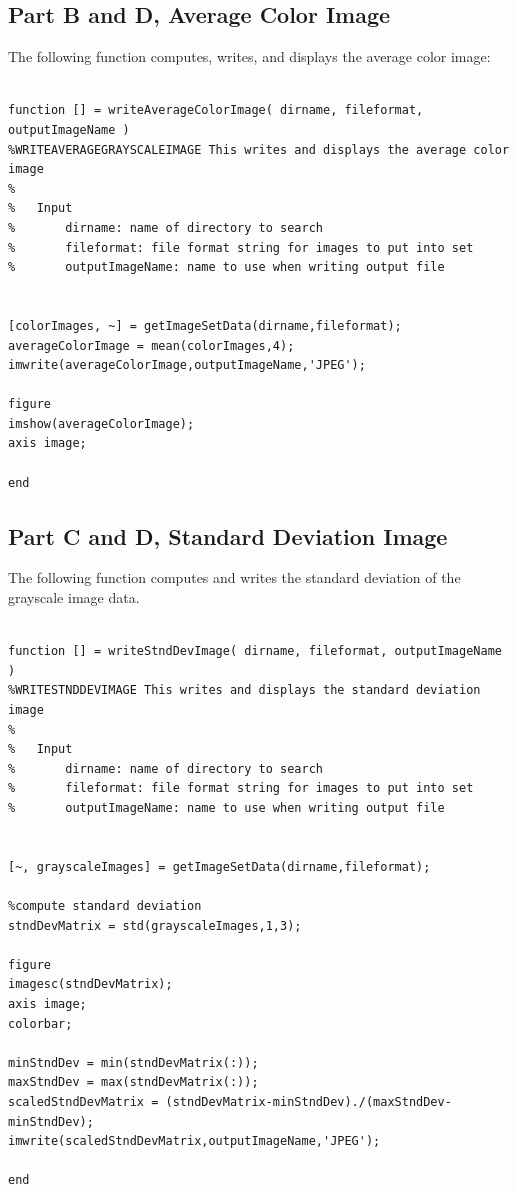 \documentclass[11pt,psfig]{article}
\begin{document}
\subsection*{Part B and D, Average Color Image}

The following function computes, writes, and displays the average color image:

\begin{verbatim}

function [] = writeAverageColorImage( dirname, fileformat, outputImageName )
%WRITEAVERAGEGRAYSCALEIMAGE This writes and displays the average color image
%
%   Input
%       dirname: name of directory to search
%       fileformat: file format string for images to put into set
%       outputImageName: name to use when writing output file


[colorImages, ~] = getImageSetData(dirname,fileformat);
averageColorImage = mean(colorImages,4);
imwrite(averageColorImage,outputImageName,'JPEG');

figure
imshow(averageColorImage);
axis image;

end

\end{verbatim}

\subsection*{Part C and D, Standard Deviation Image}

The following function computes and writes the standard deviation of the grayscale image data. 

\begin{verbatim}

function [] = writeStndDevImage( dirname, fileformat, outputImageName )
%WRITESTNDDEVIMAGE This writes and displays the standard deviation image
%
%   Input
%       dirname: name of directory to search
%       fileformat: file format string for images to put into set
%       outputImageName: name to use when writing output file


[~, grayscaleImages] = getImageSetData(dirname,fileformat);

%compute standard deviation
stndDevMatrix = std(grayscaleImages,1,3);

figure
imagesc(stndDevMatrix);
axis image;
colorbar;

minStndDev = min(stndDevMatrix(:));
maxStndDev = max(stndDevMatrix(:));
scaledStndDevMatrix = (stndDevMatrix-minStndDev)./(maxStndDev-minStndDev);
imwrite(scaledStndDevMatrix,outputImageName,'JPEG');

end

\end{verbatim}
\end{document}
